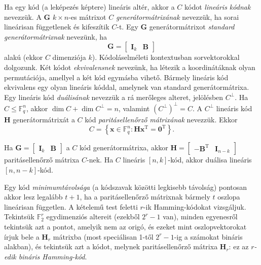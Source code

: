 \documentclass[DIV=15,appendixprefix]{scrreprt}
\theoremstyle{definition}
\theoremstyle{remark}
\DeclareMathOperator{\T}{T}
\begin{document}
Ha egy kód (a leképezés képtere) lineáris altér, akkor a $ C $ kódot \emph{lineáris kódnak}
nevezzük. A $ \mathbf{ G } $ $ k \times n $-es mátrixot $ C $ \emph{generátormátrixának} nevezzük,
ha sorai lineárisan függetlenek és kifeszítik $ C $-t. Egy $ \mathbf{ G } $ generátormátrixot
\emph{standard generátormátrixnak} nevezünk, ha
\begin{equation*}
	\mathbf{ G } = \begin{bmatrix}
		\mathbf{ I }_{ k } & \mathbf{ B }
	\end{bmatrix}
\end{equation*}
alakú (ekkor $ C $ dimenziója $ k $). Kódoláselméleti kontextusban sorvektorokkal dolgozunk. Két
kódot  \emph{ekvivalensnek} nevezünk, ha létezik a koordinátáknak olyan permutációja,
amellyel a két kód egymásba vihető. Bármely lineáris kód ekvivalens egy olyan lineáris kóddal,
amelynek van standard generátormátrixa.
%
Egy lineáris kód \emph{duálisának} nevezzük a rá merőleges alteret, jelölésben $ C^{ \perp } $. Ha
$ C \le \mathbb{ F }_{ q }^{ n } $, akkor $ \dim C + \dim C^{ \perp } = n $, valamint $ \left(
C^{ \perp } \right)^{ \perp } = C $. A $ C^{ \perp } $ lineáris kód $ \mathbf{ H } $
generátormátrixát a $ C $ kód \emph{paritásellenőrző mátrixának} nevezzük. Ekkor
\begin{equation*}
	C = \left\{ \mathbf{ x } \in \mathbb{ F }_{ q }^{ n } \colon \mathbf{ H } \mathbf{ x }^{ \T }
	= \mathbf{ 0 }^{ \T } \right\}.
\end{equation*}

Ha $ \mathbf{ G } = \begin{bmatrix} \mathbf{ I }_{ k } & \mathbf{ B } \end{bmatrix} $ a $ C $ kód
generátormátrixa, akkor $ \mathbf{ H } = \begin{bmatrix} - \mathbf{ B }^{ \T } &
\mathbf{ I }_{ n - k } \end{bmatrix} $ paritásellenőrző mátrixa $ C $-nek. Ha $ C $ lineáris
$ \left[ n,{} k \right] $-kód, akkor duálisa lineáris $ \left[ n,{} n - k \right] $-kód.

Egy kód \emph{minimumtávolsága} (a kódszavak közötti legkisebb távolság) pontosan akkor lesz
legalább $ t + 1 $, ha a paritásellenőrző mátrixnak bármely $ t $ oszlopa lineárisan független.
%
A kételemű test feletti $ r $-ik Hamming-kódokat vizsgáljuk. Tekintsük $ \mathbb{ F }_{ 2 }^{ r } $
egydimenziós altereit (ezekből $ 2^{ r } - 1 $ van), minden egyenesről tekintsük azt a pontot,
amelyik nem az origó, és ezeket mint oszlopvektorokat írjuk bele a $ \mathbf{ H }_{ r } $ mátrixba
(most speciálisan 1-től $ 2^{ r } - 1 $-ig a számokat bináris alakban), és tekintsük azt a kódot,
melynek paritásellenőrző mátrixa $ \mathbf{ H }_{ r } $: ez az \emph{$ r $-edik bináris
Hamming-kód}.
\end{document}
